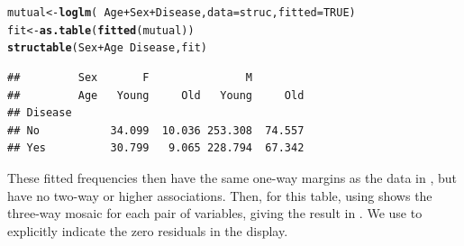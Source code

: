 \documentclass[11pt]{book}\usepackage[]{graphicx}\usepackage[]{color}
\makeatletter
\newcommand{\hlnum}[1]{\textcolor[rgb]{0.686,0.059,0.569}{#1}}%
\newcommand{\hlopt}[1]{\textcolor[rgb]{0,0,0}{#1}}%
\newcommand{\hlstd}[1]{\textcolor[rgb]{0.345,0.345,0.345}{#1}}%
\newcommand{\hlkwb}[1]{\textcolor[rgb]{0.69,0.353,0.396}{#1}}%
\newcommand{\hlkwc}[1]{\textcolor[rgb]{0.333,0.667,0.333}{#1}}%
\newcommand{\hlkwd}[1]{\textcolor[rgb]{0.737,0.353,0.396}{\textbf{#1}}}%
\newenvironment{kframe}{%
 \def\at@end@of@kframe{}%
 \ifinner\ifhmode%
  \def\at@end@of@kframe{\end{minipage}}%
  \begin{minipage}{\columnwidth}%
 \fi\fi%
 \def\FrameCommand##1{\hskip\@totalleftmargin \hskip-\fboxsep
 \colorbox{shadecolor}{##1}\hskip-\fboxsep
     \hskip-\linewidth \hskip-\@totalleftmargin \hskip\columnwidth}%
 \MakeFramed {\advance\hsize-\width
   \@totalleftmargin\z@ \linewidth\hsize
   \@setminipage}}%
 {\par\unskip\endMakeFramed%
 \at@end@of@kframe}
\newenvironment{knitrout}{}{} %
\renewenvironment{knitrout}{\small\renewcommand{\baselinestretch}{.85}}{} %
\makeatother
\begin{document}
\begin{knitrout}
\color{fgcolor}\begin{kframe}
\begin{alltt}
\hlstd{mutual} \hlkwb{<-} \hlkwd{loglm}\hlstd{(}\hlopt{~}\hlstd{Age}\hlopt{+}\hlstd{Sex}\hlopt{+}\hlstd{Disease,} \hlkwc{data}\hlstd{=struc,} \hlkwc{fitted}\hlstd{=}\hlnum{TRUE}\hlstd{)}
\hlstd{fit} \hlkwb{<-} \hlkwd{as.table}\hlstd{(}\hlkwd{fitted}\hlstd{(mutual))}
\hlkwd{structable}\hlstd{(Sex}\hlopt{+}\hlstd{Age} \hlopt{~} \hlstd{Disease, fit)}
\end{alltt}
\begin{verbatim}
##         Sex       F               M        
##         Age   Young     Old   Young     Old
## Disease                                    
## No           34.099  10.036 253.308  74.557
## Yes          30.799   9.065 228.794  67.342
\end{verbatim}
\end{kframe}
\end{knitrout}

These fitted frequencies then have the same one-way margins as the
data in , but have no two-way or higher associations.
Then,  for this table, using 
shows the three-way mosaic for each pair of variables, giving
the result in .  We use 
to explicitly indicate the zero residuals in the display.
\end{document}
